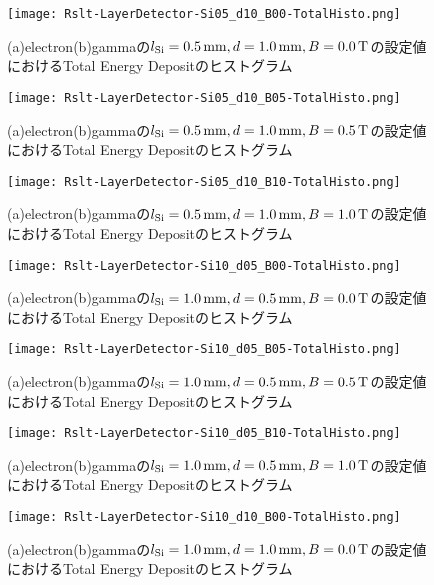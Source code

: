 \documentclass[a4paper,10pt]{jreport}
\begin{document}
\begin{figure}[H]
	\center
	\texttt{[image: Rslt-LayerDetector-Si05\_d10\_B00-TotalHisto.png]}
	\caption{(a)electron(b)gammaの$l_{\rm{Si}}=\SI{0.5}{mm}, d=\SI{1.0}{mm}, B=\SI{0.0}{T}$の設定値におけるTotal Energy Depositのヒストグラム}
	\label{Rslt-LayerDetector-Si05_d10_B00-TotalHisto}
\end{figure}

\begin{figure}[H]
	\center
	\texttt{[image: Rslt-LayerDetector-Si05\_d10\_B05-TotalHisto.png]}
	\caption{(a)electron(b)gammaの$l_{\rm{Si}}=\SI{0.5}{mm}, d=\SI{1.0}{mm}, B=\SI{0.5}{T}$の設定値におけるTotal Energy Depositのヒストグラム}
	\label{Rslt-LayerDetector-Si05_d10_B05-TotalHisto}
\end{figure}

\begin{figure}[H]
	\center
	\texttt{[image: Rslt-LayerDetector-Si05\_d10\_B10-TotalHisto.png]}
	\caption{(a)electron(b)gammaの$l_{\rm{Si}}=\SI{0.5}{mm}, d=\SI{1.0}{mm}, B=\SI{1.0}{T}$の設定値におけるTotal Energy Depositのヒストグラム}
	\label{Rslt-LayerDetector-Si05_d10_B10-TotalHisto}
\end{figure}

\begin{figure}[H]
	\center
	\texttt{[image: Rslt-LayerDetector-Si10\_d05\_B00-TotalHisto.png]}
	\caption{(a)electron(b)gammaの$l_{\rm{Si}}=\SI{1.0}{mm}, d=\SI{0.5}{mm}, B=\SI{0.0}{T}$の設定値におけるTotal Energy Depositのヒストグラム}
	\label{Rslt-LayerDetector-Si10_d05_B00-TotalHisto}
\end{figure}

\begin{figure}[H]
	\center
	\texttt{[image: Rslt-LayerDetector-Si10\_d05\_B05-TotalHisto.png]}
	\caption{(a)electron(b)gammaの$l_{\rm{Si}}=\SI{1.0}{mm}, d=\SI{0.5}{mm}, B=\SI{0.5}{T}$の設定値におけるTotal Energy Depositのヒストグラム}
	\label{Rslt-LayerDetector-Si10_d05_B05-TotalHisto}
\end{figure}

\begin{figure}[H]
	\center
	\texttt{[image: Rslt-LayerDetector-Si10\_d05\_B10-TotalHisto.png]}
	\caption{(a)electron(b)gammaの$l_{\rm{Si}}=\SI{1.0}{mm}, d=\SI{0.5}{mm}, B=\SI{1.0}{T}$の設定値におけるTotal Energy Depositのヒストグラム}
	\label{Rslt-LayerDetector-Si10_d05_B10-TotalHisto}
\end{figure}

\begin{figure}[H]
	\center
	\texttt{[image: Rslt-LayerDetector-Si10\_d10\_B00-TotalHisto.png]}
	\caption{(a)electron(b)gammaの$l_{\rm{Si}}=\SI{1.0}{mm}, d=\SI{1.0}{mm}, B=\SI{0.0}{T}$の設定値におけるTotal Energy Depositのヒストグラム}
	\label{Rslt-LayerDetector-Si10_d10_B00-TotalHisto}
\end{figure}
\end{document}
